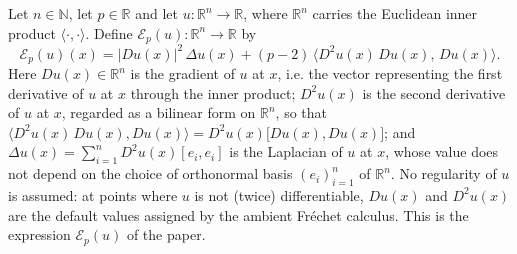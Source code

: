\begin{definition}
Let $n\in\mathbb{N}$, let $p\in\mathbb{R}$ and let $u:\mathbb{R}^n\to\mathbb{R}$,
where $\mathbb{R}^n$ carries the Euclidean inner product
$\langle\cdot,\cdot\rangle$. Define $\mathcal{E}_p(u):\mathbb{R}^n\to\mathbb{R}$
by
\[
  \mathcal{E}_p(u)(x)
  =\lvert Du(x)\rvert^{2}\,\Delta u(x)
   +(p-2)\,\bigl\langle D^{2}u(x)\,Du(x),\,Du(x)\bigr\rangle .
\]
Here $Du(x)\in\mathbb{R}^n$ is the gradient of $u$ at $x$, i.e. the vector
representing the first derivative of $u$ at $x$ through the inner product;
$D^2u(x)$ is the second derivative of $u$ at $x$, regarded as a bilinear form on
$\mathbb{R}^n$, so that
$\langle D^{2}u(x)\,Du(x),Du(x)\rangle=D^{2}u(x)\bigl[Du(x),Du(x)\bigr]$; and
$\Delta u(x)=\sum_{i=1}^{n}D^{2}u(x)[e_i,e_i]$ is the Laplacian of $u$ at $x$,
whose value does not depend on the choice of orthonormal basis $(e_i)_{i=1}^n$
of $\mathbb{R}^n$. No regularity of $u$ is assumed: at points where $u$ is not
(twice) differentiable, $Du(x)$ and $D^2u(x)$ are the default values assigned by
the ambient Fr\'echet calculus. This is the expression $\mathcal{E}_p(u)$ of the
paper.
\end{definition}
